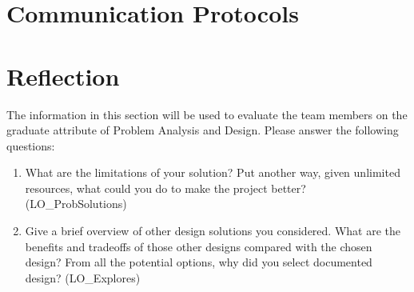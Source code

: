 \documentclass[12pt, titlepage]{article}
\begin{document}
\section{Communication Protocols}

\section{Reflection}

The information in this section will be used to evaluate the team members on the
graduate attribute of Problem Analysis and Design.  Please answer the following questions:

\begin{enumerate}
  \item What are the limitations of your solution?  Put another way, given
  unlimited resources, what could you do to make the project better? (LO\_ProbSolutions)
  \item Give a brief overview of other design solutions you considered.  What
  are the benefits and tradeoffs of those other designs compared with the chosen
  design?  From all the potential options, why did you select documented design?
  (LO\_Explores)
\end{enumerate}
\end{document}
